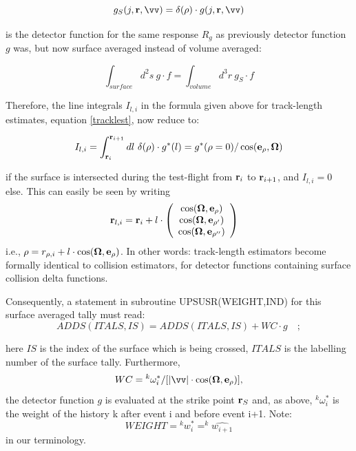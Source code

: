 \begin{displaymath}
  g_S (j, \vr, \vv ) = \delta(\rho)  \cdot  g(j, \vr, \vv )
\end{displaymath}

is the detector function for the same response $ R_g $ as previously detector
function $g$ was, but now surface averaged instead of volume averaged:

\begin{displaymath}
  \int_{surface}   d^2 s  \ g  \cdot	f =
  \int_{volume}  d^3 r \
  g_S	\cdot	f
\end{displaymath}

Therefore, the line integrals $ I_{l,i} $ in the formula given above for
track-length estimates, equation \cref{tracklest}, now reduce to:

\begin{equation}
  I_{l,i} = \int_{\mathbf{r}_i}^{\mathbf{r}_{i+1}} dl \  \delta(\rho)  \cdot	g^{*} (l) =
  g^{*} (\rho=0)	    /  \cos( \mathbf{e}_{\rho}, \mathbf{\Omega} )
\end{equation}

if the surface is intersected during the test-flight from $ \mathbf{r}_i $ to $
  \mathbf{r}_{i+1} $, and $ I_{l,i} = 0 $ else.
This can easily be seen by writing
\begin{align}
  \mathbf{r}_{l,i} & = \mathbf{r}_i + l  \cdot
  \left(
    \begin{array} {c} \cos(\mathbf{\Omega}, \mathbf{e}_{\rho} ) \\
      \cos(\mathbf{\Omega}, \mathbf{e}_{\rho '} )
      \\  \cos(\mathbf{\Omega},\mathbf{e}_{\rho ''})
    \end{array}
  \right)
\end{align}
i.e., $\rho= r_{\rho, i} + l  \cdot  \cos( \mathbf{\Omega}, \mathbf{e}_{\rho} )$.
In other words: track-length estimators become formally identical to collision
estimators, for detector functions containing surface collision delta
functions.

Consequently, a statement in subroutine UPSUSR(WEIGHT,IND) for this surface
averaged tally must read:
\begin{displaymath}
  ADDS(ITALS,IS)=ADDS(ITALS,IS) + WC   \cdot   g	\quad ;
\end{displaymath}

here $IS$ is the index of the surface which is being crossed, $ITALS$ is the
labelling number of the surface tally.
Furthermore,
\begin{displaymath}
  WC= {^k{\omega^{*}_i}}  /  [ |\vv | \cdot
  \cos( \vOmega, \ve_{\rho} ) ],
\end{displaymath}
the detector function $g$ is
evaluated at the strike point $ \mathbf{r}_S $ and, as above, $ {^k{\omega^{*}_i}}  $
is the weight of the history k after event i and before event i+1.
Note:
\begin{displaymath}
  WEIGHT = {^k {w^{*}_i}} = ^k {\hat{w_{i+1}}}
\end{displaymath}
in our
terminology.

